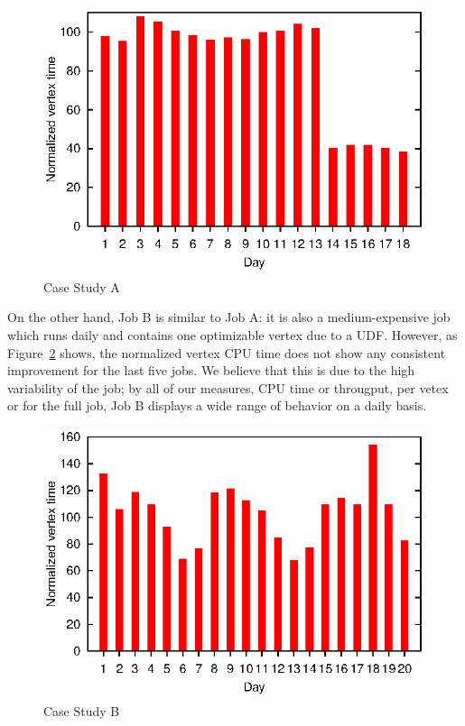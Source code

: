 \begin{figure}[ht]
\includegraphics{graphs/normalizedTimes}
\caption{Case Study A \label{fig:CaseStudyA}}
\end{figure}

On the other hand, Job B is similar to Job A: it is also a medium-expensive job which runs daily and contains one optimizable vertex due to a UDF.
However, as Figure~\ref{fig:CaseStudyB} shows, the normalized vertex CPU time does not show any consistent improvement for the last five jobs.
We believe that this is due to the high variability of the job; by all of our measures, CPU time or througput, per vetex or for the full job, Job B displays a wide range of behavior on a daily basis.
\begin{figure}[ht]
\includegraphics{graphs/normalizedTimesB}
\caption{Case Study B \label{fig:CaseStudyB}}
\end{figure}


